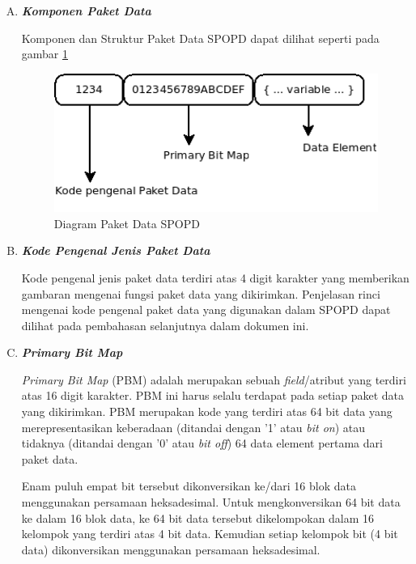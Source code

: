 \begin{enumerate}[A.] 
  \item \textbf{\textit{Komponen Paket Data}}
  
  Komponen dan Struktur Paket Data SPOPD dapat dilihat seperti pada gambar \ref{fig:komponenpaketdata}
  
  \begin{figure}[H]
    \centering
    \includegraphics[width=1\textwidth]{./resources/dia-komponen-paket-data}
    \caption{Diagram Paket Data SPOPD}
    \label{fig:komponenpaketdata}    
  \end{figure}
  
  \item \textbf{\textit{Kode Pengenal Jenis Paket Data}}

  Kode pengenal jenis paket data terdiri atas 4 digit karakter yang memberikan gambaran mengenai fungsi paket data yang dikirimkan. Penjelasan rinci mengenai kode pengenal paket data yang digunakan dalam SPOPD dapat dilihat pada pembahasan selanjutnya dalam dokumen ini.
  
  \item \textbf{\textit{Primary Bit Map}} 
  
  \textit{Primary Bit Map} (PBM) adalah merupakan sebuah \textit{field}/atribut yang terdiri atas 16 digit karakter. PBM ini harus selalu terdapat pada setiap paket data yang dikirimkan. PBM merupakan kode yang terdiri atas 64 bit data yang merepresentasikan keberadaan (ditandai dengan '1' atau \textit{bit on}) atau tidaknya (ditandai dengan '0' atau \textit{bit off}) 64 data element pertama dari paket data.
  
  Enam puluh empat bit tersebut dikonversikan ke/dari 16 blok data menggunakan persamaan heksadesimal. Untuk mengkonversikan 64 bit data ke dalam 16 blok data, ke 64 bit data tersebut dikelompokan dalam 16 kelompok yang terdiri atas 4 bit data. Kemudian setiap kelompok bit (4 bit data) dikonversikan menggunakan persamaan heksadesimal.
  

\end{enumerate}
